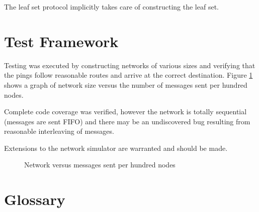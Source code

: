 \documentclass{article}
\begin{document}
The leaf set protocol implicitly takes care of constructing the leaf set.

\section{Test Framework}

Testing was executed by constructing networks of various sizes and
verifying that the pings follow reasonable routes and arrive at the
correct destination.   Figure \ref{fig:message} shows a graph of
network size versus the number of messages sent per hundred nodes.

Complete code coverage was verified, however the network is totally
sequential (messages are sent FIFO) and there may be an
undiscovered bug resulting from reasonable interleaving of messages.

Extensions to the network simulator are warranted and should be made.

\begin{figure}[t]
\centerline{}
\caption{Network versus messages sent per hundred nodes}
\label{fig:message}
\end{figure}

\section{Glossary}
\end{document}
